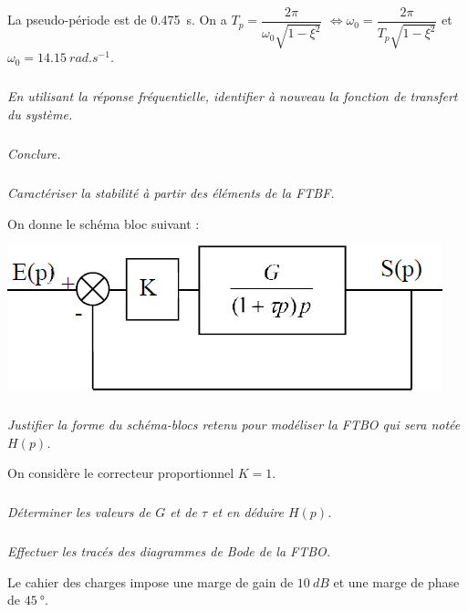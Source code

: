 \documentclass[10pt,fleqn]{article} %
\begin{document}
\begin{multicols}{2}
\begin{corrige}
La pseudo-période est de \SI{0,475}{s}. On a  $T_p=\dfrac{2\pi}{\omega_0\sqrt{1-\xi^2}}$
$\Leftrightarrow \omega_0=\dfrac{2\pi}{T_p\sqrt{1-\xi^2}}$ et $\omega_0=\SI{14,15}{rad.s^{-1}}$.
 
\end{corrige}
\else
\fi

\subparagraph{}\textit{En utilisant la réponse fréquentielle, identifier à nouveau la fonction de transfert du système.}
\ifprof
\begin{corrige}
\end{corrige}
\else
\fi

\subparagraph{}\textit{Conclure.}
\ifprof
\begin{corrige}
\end{corrige}
\else
\fi

\subparagraph{}\textit{Caractériser la stabilité à partir des éléments de la FTBF.}
\ifprof
\begin{corrige}
\end{corrige}
\else
\fi
On donne le schéma bloc suivant :

\begin{center}
\includegraphics[width=\linewidth]{images/fig_02}
\end{center}

\subparagraph{}\textit{Justifier la forme du schéma-blocs retenu pour modéliser la FTBO qui sera notée $H(p)$.}
\ifprof
\begin{corrige}
\end{corrige}
\else
\fi

On considère le correcteur proportionnel $K=1$. 
\subparagraph{}\textit{Déterminer les valeurs de $G$ et de $\tau$ et en déduire $H(p)$.}
\ifprof
\begin{corrige}
\end{corrige}
\else
\fi

\subparagraph{}\textit{Effectuer les tracés des diagrammes de Bode de la FTBO.}
\ifprof
\begin{corrige}
\end{corrige}
\else
\fi
Le cahier des charges impose une marge de gain de $\SI{10}{dB}$ et une marge de phase de $
\SI{45}{\degree}$.


\end{multicols}
\end{document}

